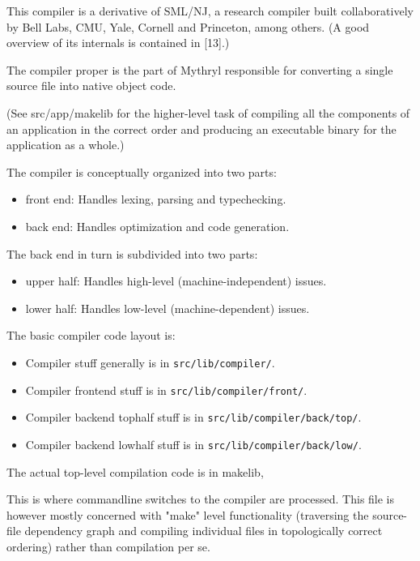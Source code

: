 This compiler is a derivative of {\sc SML/NJ}, a research 
compiler built collaboratively by Bell Labs, CMU, Yale, 
Cornell and Princeton, among others.  (A good overview 
of its internals is contained in [13].)

The compiler proper is the part of Mythryl responsible 
for converting a single source file into native 
object code.

(See src/app/makelib for the higher-level task of compiling 
all the components of an application in the correct 
order and producing an executable binary for the application 
as a whole.)

The compiler is conceptually organized into two parts:

\begin{itemize}
\item front end:  Handles lexing, parsing and typechecking.
\item back  end:  Handles optimization and code generation.
\end{itemize}
  
The back end in turn is subdivided into two parts:
\begin{itemize}
\item upper half:    Handles high-level (machine-independent) issues.
\item lower half:    Handles low-level  (machine-dependent) issues.
\end{itemize}

The basic compiler code layout is:

\begin{itemize}
\item Compiler stuff generally is in {\tt src/lib/compiler/}.
\item Compiler frontend stuff is in {\tt src/lib/compiler/front/}.
\item Compiler backend tophalf stuff is in {\tt src/lib/compiler/back/top/}.
\item Compiler backend lowhalf stuff is in {\tt src/lib/compiler/back/low/}.
\end{itemize}

The actual top-level compilation code is in makelib, 

This is where commandline switches to the compiler are 
processed.  This file is however mostly concerned with 
"make" level functionality (traversing the source-file 
dependency graph and compiling individual files in 
topologically correct ordering) rather than compilation 
per se.

